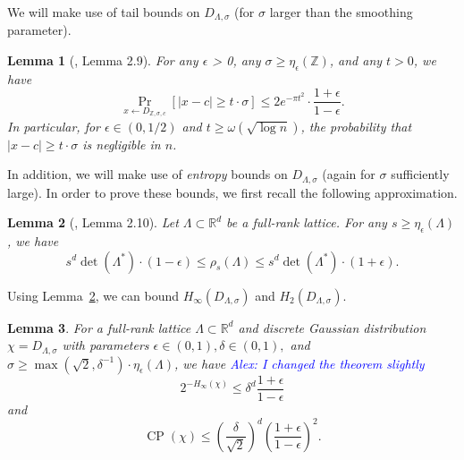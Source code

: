 \documentclass[11pt]{article}
\newcommand{\Z}{\mathbb{Z}}
\newcommand{\R}{\mathbb{R}}
\newcommand{\abs}[1]{|#1 |}
\newcommand{\sample}{\leftarrow}
\newtheorem{lemma}{Lemma}[section]
\DeclareMathOperator{\cp}{CP}
\newcommand{\anote}[1]{\textcolor{blue}{Alex: {#1}}}
\begin{document}
We will make use of tail bounds on $D_{\Lambda, \sigma}$ (for $\sigma$ larger than the smoothing parameter). 
\begin{lemma}[\cite{trapdoor}, Lemma 2.9] \label{lemma:tailIneq}
For any $\epsilon$ > 0, any $\sigma \geq \eta_{\epsilon}(\Z)$, and any $t > 0$, we have
$$\underset{x\sample D_{\Z,\sigma,c}}{\Pr}\left[\abs{x -c} \geq t \cdot \sigma\right] \leq 2e^{-\pi t^2}\cdot \frac{1+\epsilon}{1-\epsilon}.$$
In particular, for $\epsilon\in (0,1/2
)$ and $t \geq \omega(\sqrt{\log n})$, the probability that $\abs{x - c} \geq t \cdot \sigma$ is negligible in $n$.

\end{lemma}

In addition, we will make use of \emph{entropy} bounds on $D_{\Lambda,\sigma}$ (again for $\sigma$ sufficiently large). In order to prove these bounds, we first recall the following approximation. 
\begin{lemma}[\cite{Peikert:2006:ECH:2180286.2180297}, Lemma 2.10] \label{lemma:rho}
Let $\Lambda\subset \R^d$ be a full-rank lattice. For any $s \geq \eta_{\epsilon} (\Lambda)$, we have  
$$s^d \det(\Lambda^*) \cdot (1-\epsilon) \leq \rho_{ s}(\Lambda) \leq s^d \det(\Lambda^*) \cdot (1+\epsilon).$$
\end{lemma}
Using Lemma~\ref{lemma:rho}, we can bound $H_\infty(D_{\Lambda, \sigma})$ and $H_2(D_{\Lambda, \sigma})$. 
\begin{lemma} \label{lemma:clmpmfbound}
For a full-rank lattice $\Lambda \subset \mathbb R^d$ and discrete Gaussian distribution $\chi = D_{\Lambda, \sigma}$ with parameters $ \epsilon\in (0,1), \delta \in (0,1),$ and $\sigma \geq \max(\sqrt{2}, \delta^{-1})\cdot \eta_{\epsilon}(\Lambda)$, we have \anote{I changed the theorem slightly}
\[2^{-H_\infty(\chi)} \leq \delta^{d} \frac{1 + \epsilon}{1-\epsilon}
\]
and 
\[\cp(\chi) \leq \left(\frac \delta {\sqrt 2}\right)^{d} (\frac{1 + \epsilon}{1-\epsilon})^2.
\]
\end{lemma}
\end{document}
